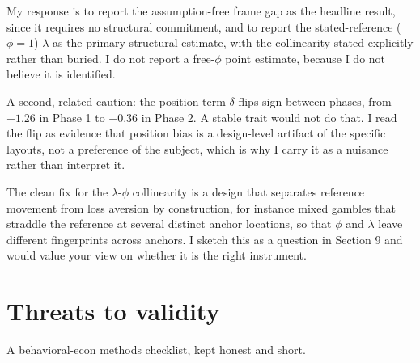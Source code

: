 \documentclass[11pt]{article}
\begin{document}
My response is to report the assumption-free frame gap as the headline result, since it requires no
structural commitment, and to report the stated-reference ($\phi = 1$) $\lambda$ as the primary
structural estimate, with the collinearity stated explicitly rather than buried. I do not report a
free-$\phi$ point estimate, because I do not believe it is identified.

A second, related caution: the position term $\delta$ flips sign between phases, from $+1.26$ in
Phase 1 to $-0.36$ in Phase 2. A stable trait would not do that. I read the flip as evidence that
position bias is a design-level artifact of the specific layouts, not a preference of the subject,
which is why I carry it as a nuisance rather than interpret it.

\begin{notebox}
The clean fix for the $\lambda$-$\phi$ collinearity is a design that separates reference movement
from loss aversion by construction, for instance mixed gambles that straddle the reference at
several distinct anchor locations, so that $\phi$ and $\lambda$ leave different fingerprints across
anchors. I sketch this as a question in Section 9 and would value your view on whether it is the
right instrument.
\end{notebox}

\section{Threats to validity}

A behavioral-econ methods checklist, kept honest and short.
\end{document}
